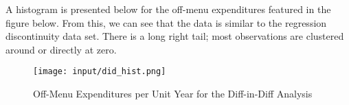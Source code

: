 A histogram is presented below for the off-menu expenditures featured in the figure below. 
From this, we can see that the data is similar to the regression discontinuity data set. 
There is a long right tail; most observations are clustered around or directly at zero. 

\begin{figure}[H]
    \centering
    \texttt{[image: input/did\_hist.png]}
    \caption{Off-Menu Expenditures per Unit Year for the Diff-in-Diff Analysis}
    \label{fig:my_label}
\end{figure}

